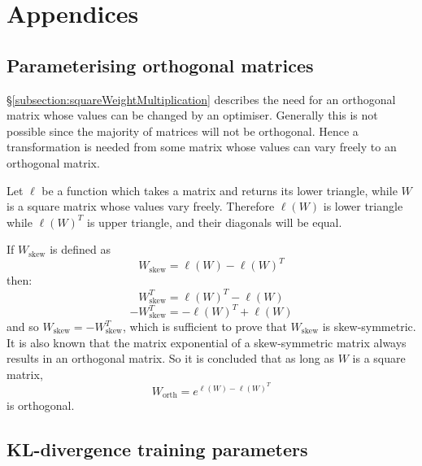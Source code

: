 \documentclass[../main.tex]{subfiles}
\begin{document}
\chapter*{Appendices} \label{chapter:appendices}

\renewcommand{\thesection}{\Alph{section}}
\setcounter{section}{0}
\renewcommand*{\theHsection}{chX.\the\value{section}}

\section{Parameterising orthogonal matrices} \label{appendix:parameterisingOrthogonalMatrices}

\S\ref{subsection:squareWeightMultiplication} describes the need for an orthogonal matrix whose values can be changed by an optimiser.
Generally this is not possible since the majority of matrices will not be orthogonal.
Hence a transformation is needed from some matrix whose values can vary freely to an orthogonal matrix.

Let $\ell$ be a function which takes a matrix and returns its lower triangle, while $W$ is a square matrix whose values vary freely.
Therefore $\ell(W)$ is lower triangle while $\ell(W)^T$ is upper triangle, and their diagonals will be equal.

If $W_\text{skew}$ is defined as
\begin{equation}
    W_\text{skew}=\ell(W)-\ell(W)^T
\end{equation}
then:
\begin{equation}
    W_\text{skew}^T=\ell(W)^T-\ell(W)
\end{equation}
\begin{equation}
    -W_\text{skew}^T=-\ell(W)^T+\ell(W)
\end{equation}
and so $W_\text{skew}=-W_\text{skew}^T$, which is sufficient to prove that $W_\text{skew}$ is skew-symmetric.
It is also known that the matrix exponential of a skew-symmetric matrix always results in an orthogonal matrix.
So it is concluded that as long as $W$ is a square matrix,
\begin{equation}
    W_\text{orth}=e^{\ell(W)-\ell(W)^T}
\end{equation}
is orthogonal.

\section{KL-divergence training parameters} \label{appendix:klTrainingParameters}
\end{document}
